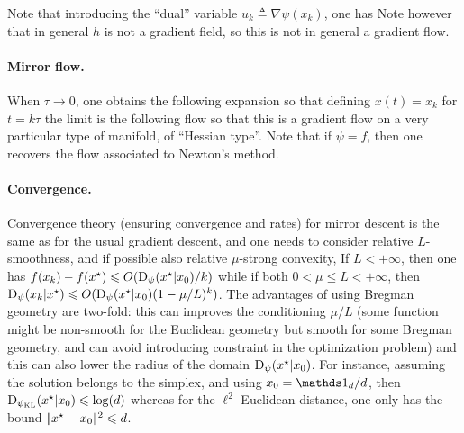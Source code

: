 Note that introducing the ``dual'' variable $u_k \triangleq \nabla \psi(x_k)$, one has
Note however that in general $h$ is not a gradient field, so this is not in general a gradient flow.

\paragraph{Mirror flow.}

When $\tau \to 0$, one obtains the following expansion
so that defining $x(t)=x_{k}$ for $t=k \tau$ the limit is the following flow
 so that this is a gradient flow on a very particular type of manifold, of ``Hessian type''.
%
Note that if $\psi=f$, then one recovers the flow associated to Newton's method.

\paragraph{Convergence.}

Convergence theory (ensuring convergence and rates) for mirror descent is the same as for the usual gradient descent, and one needs to consider relative $L$-smoothness, and if possible also relative $\mu$-strong  convexity, 
If $L<+\infty$, then one has $f(x_k)-f(x^\star) \leqslant O( \operatorname{D}_\psi(x^\star|x_0)/k)$
while if both $0<\mu \leq L <+\infty$, then $\operatorname{D}_\psi(x_k|x^\star) \leqslant O( \operatorname{D}_\psi(x^\star|x_0) (1-\mu/L)^k)$.
%
The advantages of using Bregman geometry are two-fold: this can improves the conditioning $\mu/L$ (some function might be non-smooth for the Euclidean geometry but smooth for some Bregman geometry, and can avoid introducing constraint in the optimization problem) and this can also lower the radius of the domain  $\operatorname{D}_\psi(x^\star|x_0)$. 
%
For instance, assuming the solution belongs to the simplex, and using $x_0=\ones_d/d$, then $\operatorname{D}_{\psi_{\operatorname{KL}}}(x^\star|x_0) \leqslant \log(d)$ whereas for the $\ell^2$ Euclidean distance, one only has the bound $|\!| x^\star-x_0 |\!|^2 \leqslant d$.


